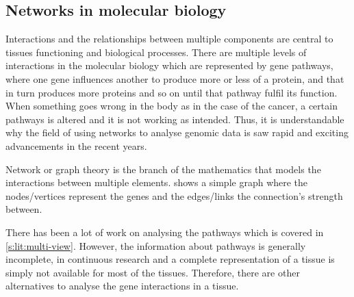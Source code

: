 \subsection{Networks in molecular biology} \label{s:lit:nets_bio}

\vspace{3mm}
\vspace{3mm}

Interactions and the relationships between multiple components are central to tissues functioning and biological processes. There are multiple levels of interactions in the molecular biology which are represented by gene pathways, where one gene influences another to produce more or less of a protein, and that in turn produces more proteins and so on until that pathway fulfil its function. When something goes wrong in the body as in the case of the cancer, a certain pathways is altered and it is not working as intended. Thus, it is understandable why the field of using networks to analyse genomic data is saw rapid and exciting advancements in the recent years. 
 
Network or graph theory is the branch of the mathematics that models the interactions between multiple elements.  shows a simple graph where the nodes/vertices represent the genes and the edges/links the connection's strength between.

There has been a lot of work on analysing the pathways which is covered in \cref{s:lit:multi-view}. However, the information about pathways is generally incomplete, in continuous research and a complete representation of a tissue is simply not available for most of the tissues. Therefore, there are other alternatives to analyse the gene interactions in a tissue.

